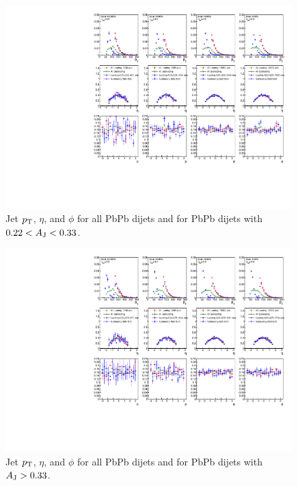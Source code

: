 \begin{figure}[htbp]
\begin{center}
\includegraphics[width=0.99\textwidth]{figures/Appendices/JetSummary_PbPb_Aj22_Aj33.pdf}
\caption{
Jet $p_{\rm T}$, $\eta$, and $\phi$ for all PbPb dijets and for PbPb dijets with $0.22<A_{\rm J}<0.33$.  
}
\label{fig:JetKinPbPbAj22Aj33}
\end{center}
\end{figure}


\begin{figure}[htbp]
\begin{center}
\includegraphics[width=0.99\textwidth]{figures/Appendices/JetSummary_PbPb_Aj33_Aj75.pdf}
\caption{
Jet $p_{\rm T}$, $\eta$, and $\phi$ for all PbPb dijets and for PbPb dijets with $A_{\rm J}>0.33$.  
}
\label{fig:JetKinPbPbAj33Aj75}
\end{center}
\end{figure}


